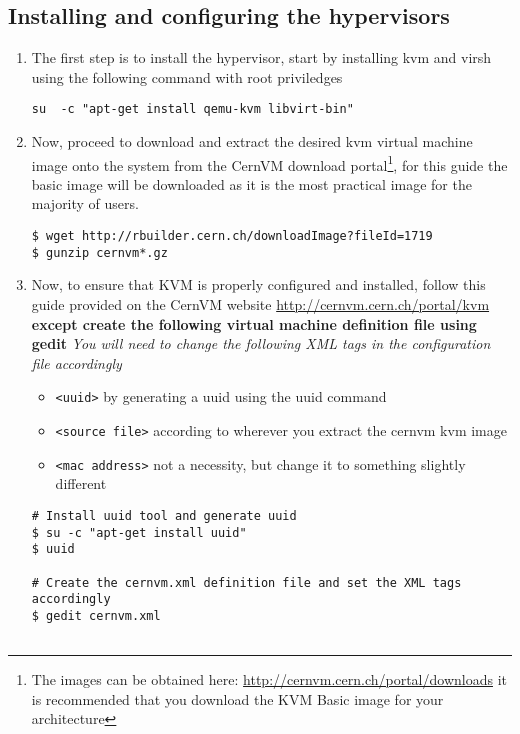 \subsection{Installing and configuring the hypervisors}
\begin{enumerate}
\item The first step is to install the hypervisor, start by installing kvm and virsh using the following command with root priviledges
\lstset{caption=Installing KVM and Virsh Support}
\begin{lstlisting}
su 	-c "apt-get install qemu-kvm libvirt-bin"
\end{lstlisting}

\item Now, proceed to download and extract the desired kvm virtual machine image onto the system from the CernVM download portal\footnote{The images can be obtained here: \url{http://cernvm.cern.ch/portal/downloads} it is recommended that you download the KVM Basic image for your architecture}, for this guide the
basic image will be downloaded as it is the most practical image for the majority of users.

\lstset{caption=Download and Extract CernVM KVM Basic Image}
\begin{lstlisting}
$ wget http://rbuilder.cern.ch/downloadImage?fileId=1719
$ gunzip cernvm*.gz
\end{lstlisting}

\item Now, to ensure that KVM is properly configured and installed, follow this guide provided on the CernVM website
\url{http://cernvm.cern.ch/portal/kvm} {\bf except create the following virtual machine definition file using gedit}
\emph{You will need to change the following XML tags in the configuration file accordingly}
\begin{itemize}
\item \verb|<uuid>| by generating a uuid using the uuid command
\item \verb|<source file>| according to wherever you extract the cernvm kvm image
\item \verb|<mac address>| not a necessity, but change it to something slightly different
\end{itemize}

\lstset{caption=Create CernVM KVM Definition File}
\begin{lstlisting}
# Install uuid tool and generate uuid
$ su -c "apt-get install uuid"
$ uuid

# Create the cernvm.xml definition file and set the XML tags accordingly
$ gedit cernvm.xml


\end{lstlisting}
\end{enumerate}
